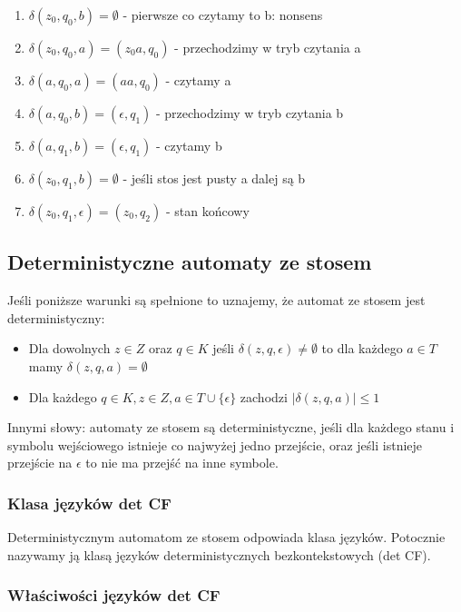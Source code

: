 \documentclass{../notatki}
\begin{document}
\begin{enumerate}
  \item $\delta(z_0, q_0, b) = \emptyset$ - pierwsze co czytamy to b: nonsens
  \item $\delta(z_0, q_0, a) = (z_0a, q_0)$ - przechodzimy w tryb czytania a
  \item $\delta(a, q_0, a) = (aa, q_0)$ - czytamy a
  \item $\delta(a, q_0, b) = (\epsilon, q_1)$ - przechodzimy w tryb czytania b
  \item $\delta(a, q_1, b) = (\epsilon, q_1)$ - czytamy b
  \item $\delta(z_0, q_1, b) = \emptyset$ - jeśli stos jest pusty a dalej są b
  \item $\delta(z_0, q_1, \epsilon) = (z_0, q_2)$ - stan końcowy
\end{enumerate}

\subsection{Deterministyczne automaty ze stosem}

Jeśli poniższe warunki są spełnione to uznajemy, że automat ze stosem jest
deterministyczny:

\begin{itemize}
  \item Dla dowolnych $z \in Z$ oraz $q \in K$ jeśli $\delta(z, q,
    \epsilon) \ne \emptyset$ to dla każdego $a \in T$ mamy $\delta(z, q,
    a) = \emptyset$
  \item Dla każdego $q \in K, z \in Z, a \in T \cup \{\epsilon\}$ zachodzi
    $|\delta(z, q, a)| \le 1$
\end{itemize}
Innymi słowy: automaty ze stosem są deterministyczne, jeśli dla każdego
stanu i symbolu wejściowego istnieje co najwyżej jedno przejście, oraz jeśli
istnieje przejście na $\epsilon$ to nie ma przejść na inne symbole.

\subsubsection{Klasa języków det CF}

Deterministycznym automatom ze stosem odpowiada klasa języków.
Potocznie nazywamy ją klasą języków deterministycznych
bezkontekstowych (det CF).

\subsubsection{Właściwości języków det CF}
\end{document}
